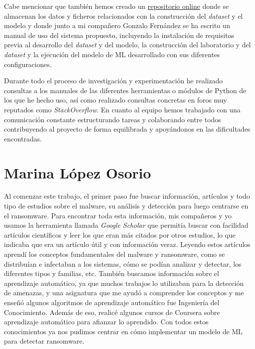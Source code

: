 Cabe mencionar que también hemos creado un \href{https://gitlab.fdi.ucm.es/marina.lopez/tfg-ransomware-20-21}{repositorio online} donde se almacenan los datos y ficheros relacionados con la construcción del \textit{dataset} y el modelo y donde junto a mi compañero Gonzalo Fernández se ha escrito un manual de uso del sistema propuesto, incluyendo la instalación de requisitos previa al desarrollo del \textit{dataset} y del modelo, la construcción del laboratorio y del \textit{dataset} y la ejecución del modelo de \gls{ML} desarrollado con sus diferentes configuraciones.

Durante todo el proceso de investigación y experimentación he realizado consultas a los manuales de las diferentes herramientas o módulos de Python de los que he hecho uso, así como realizado consultas concretas en foros muy reputados como \textit{StackOverflow}. En cuanto al equipo hemos trabajado con una comunicación constante estructurando tareas y colaborando entre todos contribuyendo al proyecto de forma equilibrada y apoyándonos en las dificultades encontradas.


\section{Marina López Osorio}
\noindent Al comenzar este trabajo, el primer paso fue buscar información, artículos y todo tipo de estudios sobre el malware, su análisis y detección para luego centrarse en el ransomware. Para encontrar toda esta información, mis compañeros y yo usamos la herramienta llamada \textit{Google Scholar} que permitía buscar con facilidad artículos científicos y leer los que eran más citados por otros estudios, lo que indicaba que era un artículo útil y con información veraz. Leyendo estos artículos aprendí los conceptos fundamentales del malware y ransomware, como se distribuían e infectaban a los sistemas, cómo se podían analizar y detectar, los diferentes tipos y familias, etc. También buscamos información sobre el aprendizaje automático, ya que muchos trabajos lo utilizaban para la detección de amenazas, y una asignatura que me ayudó a comprender los conceptos y me enseñó algunos algoritmos de aprendizaje automático fue Ingeniería del Conocimiento. Además de eso, realicé algunos cursos de Coursera sobre aprendizaje automático para afianzar lo aprendido. Con todos estos conocimientos ya nos pudimos centrar en cómo implementar un modelo de \gls{ML} para detectar ransomware.  

